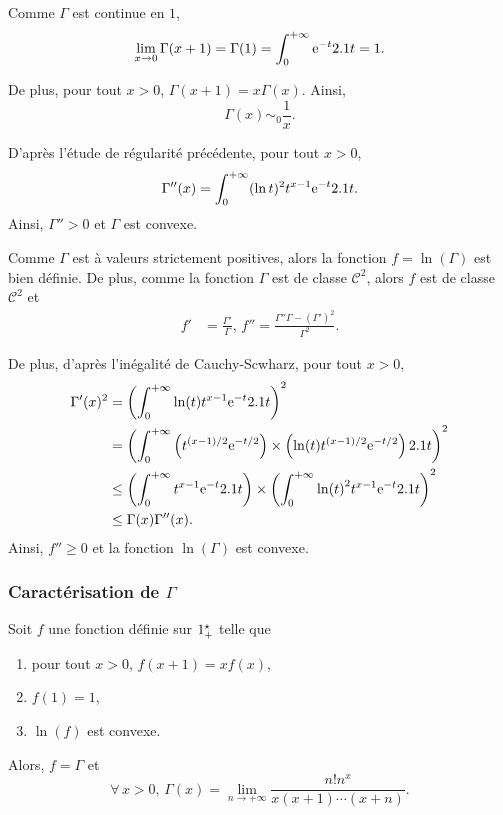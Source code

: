 \begin{solution}
\begin{reponses}
\item Comme $\Gamma$ est continue en $1$, 
\[
\lim_{x\to0} \Gamma(x + 1) = \Gamma(1) = \int_0^{+\infty} \mathrm{e}^{-t} 2.1 t = 1.
\]

De plus, pour tout $x > 0$, $\Gamma(x + 1) = x \Gamma(x)$. Ainsi,
\[
\Gamma(x) \sim_0 \frac{1}{x}.
\]

\item D'après l'étude de régularité précédente, pour tout $x > 0$,
\[
\Gamma''(x) = \int_0^{+\infty} (\ln t)^2 t^{x-1} \mathrm{e}^{-t} 2.1 t.
\]
Ainsi, $\Gamma'' > 0$ et $\Gamma$ est convexe.

\item Comme $\Gamma$ est à valeurs strictement positives, alors la fonction $f = \ln(\Gamma)$ est bien définie. De plus, comme la fonction $\Gamma$ est de classe $\mathscr{C}^2$, alors $f$ est de classe $\mathscr{C}^2$ et
\begin{align*}
f' &= \frac{\Gamma'}{\Gamma},\,
%
f'' = \frac{\Gamma'' \Gamma - (\Gamma')^2}{\Gamma^2}.
\end{align*}

De plus, d'après l'inégalité de Cauchy-Scwharz, pour tout $x > 0$,
\begin{align*}
\Gamma'(x)^2
&= \left(\int_0^{+\infty} \ln(t) t^{x-1} \mathrm{e}^{-t} 2.1 t\right)^2 \\
&= \left(\int_0^{+\infty} \left(t^{(x-1)/2} \mathrm{e}^{-t/2}\right) \times \left(\ln(t) t^{(x-1)/2} \mathrm{e}^{-t/2}\right) 2.1 t\right)^2 \\
&\leq \left(\int_0^{+\infty} t^{x-1} \mathrm{e}^{-t} 2.1 t\right) \times \left(\int_0^{+\infty} \ln(t)^2 t^{x-1} \mathrm{e}^{-t} 2.1 t\right)^2 \\
&\leq \Gamma(x) \Gamma''(x).
\end{align*}
Ainsi, $f'' \geq 0$ et la fonction $\ln(\Gamma)$ est convexe.
\end{reponses}
\end{solution}

\subsubsection{Caractérisation de $\Gamma$}


\begin{theo}{}
Soit $f$ une fonction définie sur $1^\star_+$ telle que
\begin{enumerate}
\item pour tout $x > 0$, $f(x + 1) = x f(x)$,
\item $f(1) = 1$,
\item $\ln(f)$ est convexe.
\end{enumerate}
Alors, $f = \Gamma$ et
\[
\forall\, x > 0,\,
\Gamma(x) = \lim_{n\to+\infty} \frac{n! n^x}{x (x + 1) \cdots (x + n)}.
\]
\end{theo}

